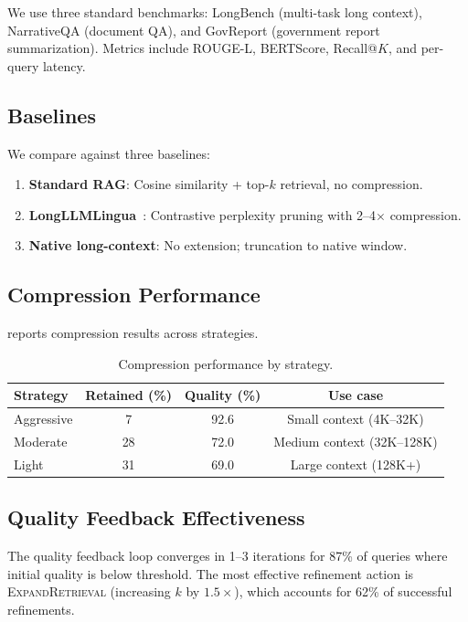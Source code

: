 \documentclass[11pt,letterpaper]{article}
\begin{document}
We use three standard benchmarks: LongBench (multi-task long context),
NarrativeQA (document QA), and GovReport (government report
summarization).  Metrics include ROUGE-L, BERTScore, Recall@$K$, and
per-query latency.

\subsection{Baselines}

We compare against three baselines:
\begin{enumerate}[nosep]
  \item \textbf{Standard RAG}: Cosine similarity + top-$k$ retrieval, no
    compression.
  \item \textbf{LongLLMLingua}~\citep{longllmlingua2024}: Contrastive
    perplexity pruning with 2--4$\times$ compression.
  \item \textbf{Native long-context}: No extension; truncation to native
    window.
\end{enumerate}

\subsection{Compression Performance}

 reports compression results across strategies.

\begin{table}[t]
\centering
\caption{Compression performance by strategy.}
\label{tab:compression}
\small
\begin{tabular}{@{}lccc@{}}
\toprule
Strategy   & Retained (\%) & Quality (\%) & Use case \\
\midrule
Aggressive &  7 & 92.6 & Small context (4K--32K) \\
Moderate   & 28 & 72.0 & Medium context (32K--128K) \\
Light      & 31 & 69.0 & Large context (128K+) \\
\bottomrule
\end{tabular}
\end{table}

\subsection{Quality Feedback Effectiveness}

The quality feedback loop converges in 1--3 iterations for 87\% of queries
where initial quality is below threshold.  The most effective refinement
action is \textsc{ExpandRetrieval} (increasing $k$ by $1.5\times$), which
accounts for 62\% of successful refinements.
\end{document}
